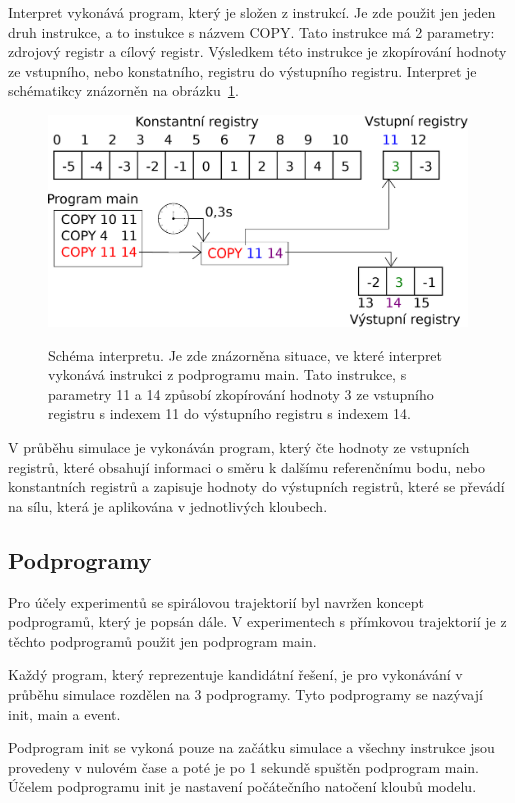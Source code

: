 Interpret vykonává program, který je složen z instrukcí.
Je zde použit jen jeden druh instrukce, a to instukce s názvem COPY\@.
Tato instrukce má 2 parametry: zdrojový registr a cílový registr.
Výsledkem této instrukce je zkopírování hodnoty ze vstupního, nebo konstatního, registru do výstupního registru.
Interpret je schématikcy znázorněn na obrázku~\ref{fig:interpret}.

\begin{figure}[h]
    \centering
    {\includegraphics[width=30em]{obrazky/interpret.eps}}
    \caption{
    Schéma interpretu.
    Je zde znázorněna situace, ve které interpret vykonává instrukci z podprogramu main.
    Tato instrukce, s parametry 11 a 14 způsobí zkopírování hodnoty 3 ze vstupního registru s indexem 11 do výstupního registru s indexem 14.
    }
    \label{fig:interpret}
\end{figure}

V průběhu simulace je vykonáván program, který čte hodnoty ze vstupních registrů, které obsahují informaci o směru k dalšímu referenčnímu bodu, nebo konstantních registrů a zapisuje hodnoty do výstupních registrů, které se převádí na sílu, která je aplikována v jednotlivých kloubech.

\subsection{Podprogramy}

Pro účely experimentů se spirálovou trajektorií byl navržen koncept podprogramů, který je popsán dále.
V experimentech s přímkovou trajektorií je z těchto podprogramů použit jen podprogram main.

Každý program, který reprezentuje kandidátní řešení, je pro vykonávání v průběhu simulace rozdělen na 3 podprogramy.
Tyto podprogramy se nazývají init, main a event.

Podprogram init se vykoná pouze na začátku simulace a všechny instrukce jsou provedeny v nulovém čase a poté je po 1 sekundě spuštěn podprogram main.
Účelem podprogramu init je nastavení počátečního natočení kloubů modelu.

